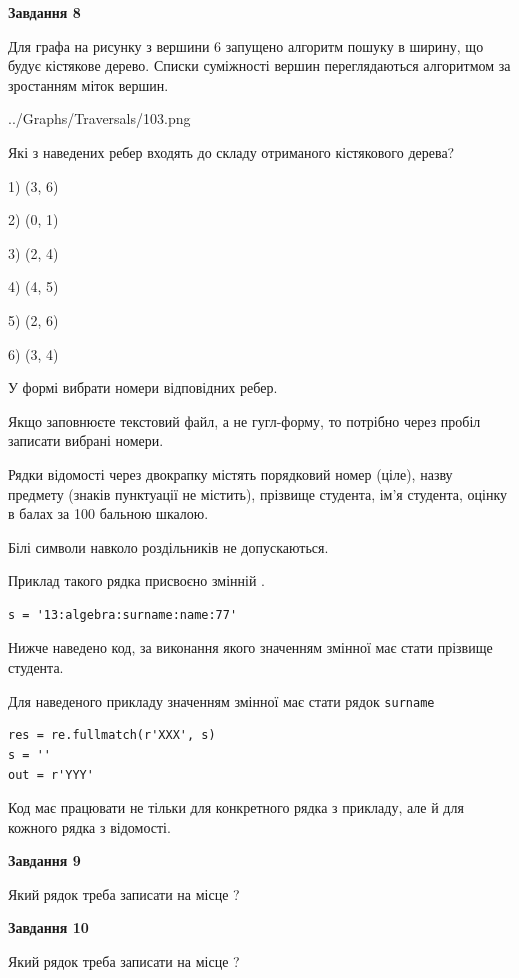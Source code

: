 \documentclass[12pt, ukrainian]{article}
\def\code#1{\Verb!#1!}
\begin{document}
{\begin {large}
{\begin {center}\textbf{Завдання 8}\end {center}}\par
Для графа на рисунку з вершини 6 запущено алгоритм пошуку в ширину, що будує кістякове дерево. Списки суміжності вершин переглядаються алгоритмом за зростанням міток вершин.\par
\begin{center}
	{../Graphs/Traversals/103.png}
\end{center}
\par Які з наведених ребер входять до складу отриманого кістякового дерева?\par
1) (3, 6)\par
2) (0, 1)\par
3) (2, 4)\par
4) (4, 5)\par
5) (2, 6)\par
6) (3, 4)\par
{\vskip 15pt} У формі вибрати номери відповідних ребер.


Якщо заповнюєте текстовий файл, а не гугл-форму, то потрібно через пробіл записа\-ти вибрані номери.\par
\newpage


Рядки відомості через двокрапку містять порядковий номер (ціле), назву предмету (знаків пунктуації не містить), прізвище студента, ім'я студента, оцінку в балах за 100 бальною шкалою.

Білі символи навколо роздільників не допускаються.

Приклад такого рядка присвоєно змінній .



\begin{verbatim}
s = '13:algebra:surname:name:77'
\end{verbatim}


Нижче наведено код, за виконання якого значенням змінної  має стати прізвище студента.

Для наведеного прикладу значенням змінної  має стати рядок \code{surname}



\begin{verbatim}
res = re.fullmatch(r'XXX', s)
s = ''
out = r'YYY'
\end{verbatim}


Код має працювати не тільки для конкретного рядка з прикладу, але й для кожного рядка з відомості.

{\begin {center}\textbf{Завдання 9}\end {center}}\par
Який рядок треба записати на місце  ?\par
\vspace{5mm}


{\begin {center}\textbf{Завдання 10}\end {center}}\par
Який рядок треба записати на місце  ?\par


\newpage


\end {large}}
\end{document}
